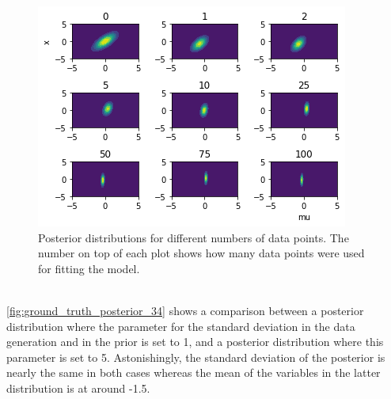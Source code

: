 \documentclass{article}
\begin{document}
\begin{figure}
	\includegraphics[width=\textwidth]{images/posterior_different_data_sizes.png}
	\caption[Posterior distributions for different numbers of data points]{Posterior distributions for different numbers of data points. The number on top of each plot shows how many data points were used for fitting the model.}
	\label{fig:posterior_different_data_sizes}
\end{figure}
\\
\autoref{fig:ground_truth_posterior_34} shows a comparison between a posterior distribution where the parameter for the standard deviation in the data generation and in the prior is set to 1, and a posterior distribution where this parameter is set to 5. Astonishingly, the standard deviation of the posterior is nearly the same in both cases whereas the mean of the variables in the latter distribution is at around -1.5.
\end{document}
